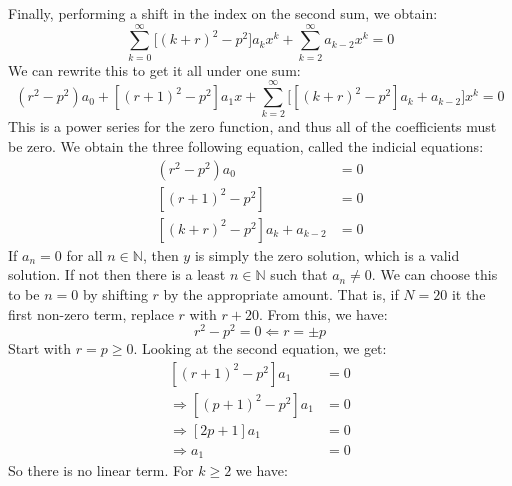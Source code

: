         Finally, performing a shift in the index on the second
        sum, we obtain:
        \begin{equation}
            \sum_{k=0}^{\infty}\Big[(k+r)^{2}-p^{2}\Big]
                a_{k}x^{k}+
            \sum_{k=2}^{\infty}a_{k-2}x^{k}=0
        \end{equation}
        We can rewrite this to get it all under one sum:
        \begin{equation}
            (r^{2}-p^{2})a_{0}+[(r+1)^{2}-p^{2}]a_{1}x+
            \sum_{k=2}^{\infty}\Big[
                [(k+r)^{2}-p^{2}]a_{k}+a_{k-2}\Big]x^{k}=0
        \end{equation}
        This is a power series for the zero function, and thus all
        of the coefficients must be zero. We obtain the three
        following equation, called the indicial equations:
        \begin{subequations}
            \begin{align}
                (r^{2}-p^{2})a_{0}&=0\\
                [(r+1)^{2}-p^{2}]&=0\\
                [(k+r)^{2}-p^{2}]a_{k}+a_{k-2}&=0
            \end{align}
        \end{subequations}
        If $a_{n}=0$ for all $n\in\mathbb{N}$, then $y$ is simply
        the zero solution, which is a valid solution. If not then
        there is a least $n\in\mathbb{N}$ such that $a_{n}\ne{0}$.
        We can choose this to be $n=0$ by shifting $r$ by the
        appropriate amount. That is, if $N=20$ it the first non-zero
        term, replace $r$ with $r+20$. From this, we have:
        \begin{equation}
            r^{2}-p^{2}=0\Longleftarrow{r}=\pm{p}
        \end{equation}
        Start with $r=p\geq{0}$. Looking at the second equation, we
        get:
        \begin{subequations}
            \begin{align}
                [(r+1)^{2}-p^{2}]a_{1}&=0\\
                \Rightarrow[(p+1)^{2}-p^{2}]a_{1}&=0\\
                \Rightarrow[2p+1]a_{1}&=0\\
                \Rightarrow{a}_{1}&=0
            \end{align}
        \end{subequations}
        So there is no linear term. For $k\geq{2}$ we have:
